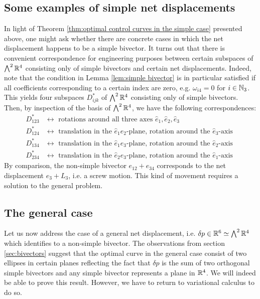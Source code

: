 \subsection{Some examples of simple net displacements}
In light of Theorem \ref{thm:optimal control curves in the simple case} presented above, one might ask whether there are concrete cases in which the net displacement happens to be a simple bivector. It turns out that there is convenient correspondence for engineering purposes between certain subspaces of $\bigwedge^2 \mathbb{R}^4$ consisting only of simple bivectors and certain net displacements. Indeed, note that the condition in Lemma \ref{lem:simple bivector} is in particular satisfied if all coefficients corresponding to a certain index are zero, e.g. $\omega_{i4} = 0$ for $i \in \mathbb{N}_3$. This yields four subspaces $D^*_{ijk}$ of $\bigwedge^2 \mathbb{R}^4$ consisting only of simple bivectors. Then, by inspection of the basis of $\bigwedge^2 \mathbb{R}^4$, we have the following correspondences:
\begin{align*}
D^{*}_{123} &\longleftrightarrow\text{ rotations around all three axes } \hat{e}_1, \hat{e}_2, \hat{e}_3\\
D^{*}_{124} &\longleftrightarrow \text{ translation in the $\hat{e}_1\hat{e}_2$-plane, rotation around the $\hat{e}_3$-axis }\\
D^{*}_{134} &\longleftrightarrow  \text{ translation in the $\hat{e}_1\hat{e}_3$-plane, rotation around the $\hat{e}_2$-axis }\\
D^{*}_{234} &\longleftrightarrow  \text{ translation in the $\hat{e}_2\hat{e}_3$-plane, rotation around the $\hat{e}_1$-axis }
\end{align*}
By comparison, the non-simple bivector $e_{12} + e_{34}$ corresponds to the net displacement $e_3 + L_3$, i.e. a screw motion. This kind of movement requires a solution to the general problem.


\subsection{The general case}

Let us now address the case of a general net displacement, i.e. $\delta p \in \mathbb{R}^6 \simeq \bigwedge^2 \mathbb{R}^4$ which identifies to a non-simple bivector. The observations from section \ref{sec:bivectors} suggest that the optimal curve in the general case consist of two ellipses in certain planes reflecting the fact that $\delta p$ is the sum of two orthogonal simple bivectors and any simple bivector represents a plane in $\mathbb{R}^4$. We will indeed be able to prove this result. However, we have to return to variational calculus to do so.


